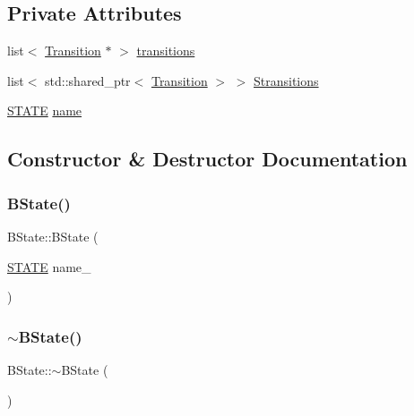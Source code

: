 \subsection*{Private Attributes}
\begin{DoxyCompactItemize}
\item 
list$<$ \hyperlink{classTransition}{Transition} $\ast$ $>$ \hyperlink{classBState_a9bd20e613fd32ef9408818eb15f80350}{transitions}
\item 
list$<$ std\+::shared\+\_\+ptr$<$ \hyperlink{classTransition}{Transition} $>$ $>$ \hyperlink{classBState_a5435ea55aa101d3b45474c81e53d1d42}{Stransitions}
\item 
\hyperlink{BState_8h_a275a67132f10277ada3a0ee3d616b647}{S\+T\+A\+TE} \hyperlink{classBState_ac4a447d0ad6729605fd5b0d74f5273bb}{name}
\end{DoxyCompactItemize}


\subsection{Constructor \& Destructor Documentation}
\mbox{\label{classBState_ab620431914f2b63b156a108cb47f9f9e}} 
\subsubsection{\texorpdfstring{B\+State()}{BState()}}
{\footnotesize\ttfamily B\+State\+::\+B\+State (\begin{DoxyParamCaption}\item[{\hyperlink{BState_8h_a275a67132f10277ada3a0ee3d616b647}{S\+T\+A\+TE}}]{name\+\_\+ }\end{DoxyParamCaption})\hspace{0.3cm}{\ttfamily [inline]}}

\mbox{\label{classBState_ab7dcf09e84afba8a5f2d1c714468ca5b}} 
\subsubsection{\texorpdfstring{$\sim$\+B\+State()}{~BState()}}
{\footnotesize\ttfamily B\+State\+::$\sim$\+B\+State (\begin{DoxyParamCaption}{ }\end{DoxyParamCaption})\hspace{0.3cm}{\ttfamily [inline]}}



